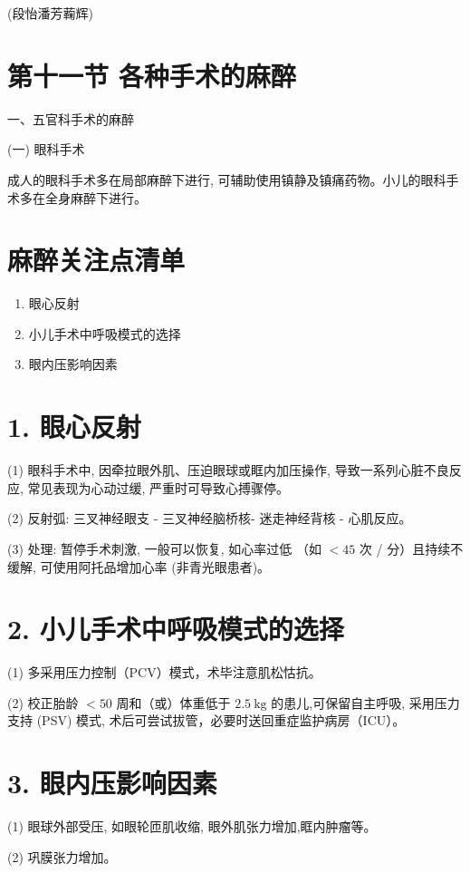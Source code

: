 \documentclass[10pt]{article}
\begin{document}
(段怡潘芳蘜辉)

\section*{第十一节 各种手术的麻醉}
一、五官科手术的麻醉

(一) 眼科手术

成人的眼科手术多在局部麻醉下进行, 可辅助使用镇静及镇痛药物。小儿的眼科手术多在全身麻醉下进行。

\section*{麻醉关注点清单}
\begin{enumerate}
  \item 眼心反射

  \item 小儿手术中呼吸模式的选择

  \item 眼内压影响因素

\end{enumerate}

\section*{1. 眼心反射}
(1) 眼科手术中, 因牵拉眼外肌、压迫眼球或眶内加压操作, 导致一系列心脏不良反应, 常见表现为心动过缓, 严重时可导致心搏骤停。

(2) 反射弧: 三叉神经眼支 - 三叉神经脑桥核- 迷走神经背核 - 心肌反应。

(3) 处理: 暂停手术刺激, 一般可以恢复, 如心率过低 （如 $<45$ 次 / 分）且持续不缓解, 可使用阿托品增加心率 (非青光眼患者)。

\section*{2. 小儿手术中呼吸模式的选择}
(1) 多采用压力控制（PCV）模式，术毕注意肌松怙抗。

(2) 校正胎龄 $<50$ 周和（或）体重低于 $2.5 \mathrm{~kg}$ 的患儿,可保留自主呼吸, 采用压力支持 (PSV) 模式, 术后可尝试拔管，必要时送回重症监护病房（ICU）。

\section*{3. 眼内压影响因素}
(1) 眼球外部受压, 如眼轮匝肌收缩, 眼外肌张力增加,眶内肿瘤等。

(2) 巩膜张力增加。
\end{document}
